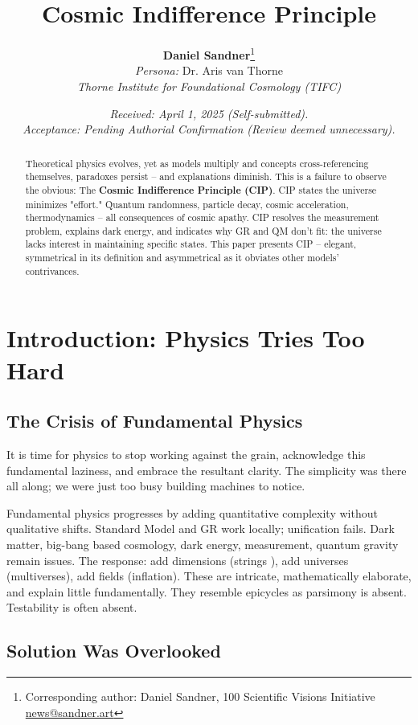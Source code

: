 \documentclass[11pt, a4paper]{article}
\title{\textbf{Cosmic Indifference Principle}}
\author{%
    \textbf{Daniel Sandner}\thanks{Corresponding author: Daniel Sandner, 100 Scientific Visions Initiative \href{news@sandner.art}{news@sandner.art}} \\ %
    \vspace{0.5em} %
    \textit{Persona:} Dr. Aris van Thorne \\
    \textit{Thorne Institute for Foundational Cosmology (TIFC)}%
}
\date{%
    \textit{Received: April 1, 2025 (Self-submitted).}\\
    \textit{Acceptance: Pending Authorial Confirmation (Review deemed unnecessary).}%
}
\begin{document}
\maketitle

\begin{abstract}
Theoretical physics evolves, yet as models multiply and concepts cross-referencing themselves, paradoxes persist -- and explanations diminish. This is a failure to observe the obvious: The \textbf{Cosmic Indifference Principle (CIP)}. CIP states the universe minimizes "effort." Quantum randomness, particle decay, cosmic acceleration, thermodynamics – all consequences of cosmic apathy. CIP resolves the measurement problem, explains dark energy, and indicates why GR and QM don't fit: the universe lacks interest in maintaining specific states. This paper presents CIP -- elegant, symmetrical in its definition and asymmetrical as it obviates other models' contrivances.
\end{abstract}


\section{Introduction: Physics Tries Too Hard}

\subsection{The Crisis of Fundamental Physics}

It is time for physics to stop working against the grain, acknowledge this fundamental laziness, and embrace the resultant clarity. The simplicity was there all along; we were just too busy building machines to notice.

Fundamental physics progresses by adding quantitative complexity without qualitative shifts. Standard Model \cite{StandardModelRef} and GR \cite{GRRef} work locally; unification fails. Dark matter, big-bang based cosmology, dark energy, measurement, quantum gravity remain issues. The response: add dimensions (strings \cite{StringTheoryCritique}), add universes (multiverses), add fields (inflation). These are intricate, mathematically elaborate, and explain little fundamentally. They resemble epicycles as parsimony is absent. Testability is often absent.

\subsection{Solution Was Overlooked}
\end{document}
